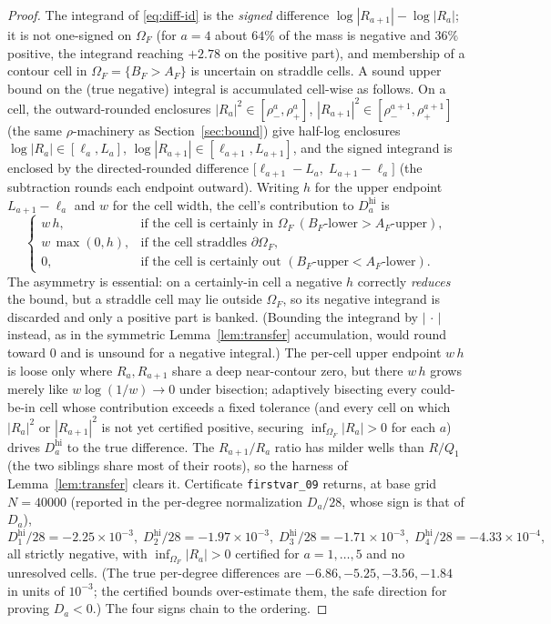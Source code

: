 \documentclass[11pt,reqno]{amsart}
\theoremstyle{plain}
\theoremstyle{definition}
\theoremstyle{remark}
\begin{document}
\begin{proof}
The integrand of \eqref{eq:diff-id} is the \emph{signed} difference
$\log|R_{a+1}|-\log|R_a|$; it is not one-signed on $\Omega_F$ (for $a=4$ about $64\%$ of
the mass is negative and $36\%$ positive, the integrand reaching $+2.78$ on the
positive part), and
membership of a contour cell in $\Omega_F=\{B_F>A_F\}$ is uncertain on straddle cells.
A sound upper bound on the (true negative) integral is accumulated cell-wise as
follows. On a cell, the outward-rounded enclosures $|R_a|^2\in[\rho^a_-,\rho^a_+]$,
$|R_{a+1}|^2\in[\rho^{a+1}_-,\rho^{a+1}_+]$ (the same $\rho$-machinery as
Section~\ref{sec:bound}) give half-log enclosures $\log|R_a|\in[\ell_a,L_a]$,
$\log|R_{a+1}|\in[\ell_{a+1},L_{a+1}]$, and the signed integrand is enclosed by the
directed-rounded difference $\bigl[\ell_{a+1}-L_a,\;L_{a+1}-\ell_a\bigr]$ (the
subtraction rounds each endpoint outward). Writing $h$ for the upper endpoint
$L_{a+1}-\ell_a$ and $w$ for the cell width, the cell's contribution to
$D_a^{\mathrm{hi}}$ is
\[
  \begin{cases}
    w\,h, & \text{if the cell is certainly in } \Omega_F\ (B_F\text{-lower}>A_F\text{-upper}),\\[2pt]
    w\,\max(0,h), & \text{if the cell straddles } \partial\Omega_F,\\[2pt]
    0, & \text{if the cell is certainly out } (B_F\text{-upper}<A_F\text{-lower}).
  \end{cases}
\]
The asymmetry is essential: on a certainly-in cell a negative $h$ correctly
\emph{reduces} the bound, but a straddle cell may lie outside $\Omega_F$, so its
negative integrand is discarded and only a positive part is banked. (Bounding the
integrand by $|\,\cdot\,|$ instead, as in the symmetric Lemma~\ref{lem:transfer}
accumulation, would round toward $0$ and is unsound for a negative integral.) The
per-cell upper endpoint $w\,h$ is loose only where $R_a,R_{a+1}$ share a deep
near-contour zero, but there $w\,h$ grows merely like $w\log(1/w)\to0$ under bisection;
adaptively bisecting every could-be-in cell whose contribution exceeds a fixed
tolerance (and every cell on which $|R_a|^2$ or $|R_{a+1}|^2$ is not yet certified
positive, securing $\inf_{\Omega_F}|R_a|>0$ for each $a$) drives $D_a^{\mathrm{hi}}$ to
the true difference. The $R_{a+1}/R_a$ ratio has milder wells than $R/Q_1$ (the two
siblings share most of their roots), so the harness of Lemma~\ref{lem:transfer} clears
it. Certificate \texttt{firstvar\_09} returns, at base grid $N=40000$ (reported in the
per-degree normalization $D_a/28$, whose sign is that of $D_a$),
\[
  D_1^{\mathrm{hi}}/28=-2.25\times10^{-3},\;
  D_2^{\mathrm{hi}}/28=-1.97\times10^{-3},\;
  D_3^{\mathrm{hi}}/28=-1.71\times10^{-3},\;
  D_4^{\mathrm{hi}}/28=-4.33\times10^{-4},
\]
all strictly negative, with $\inf_{\Omega_F}|R_a|>0$ certified for $a=1,\dots,5$ and no
unresolved cells. (The true per-degree differences are $-6.86,-5.25,-3.56,-1.84$ in
units of $10^{-3}$; the certified bounds over-estimate them, the safe direction for
proving $D_a<0$.) The four signs chain to the ordering.
\end{proof}
\end{document}
